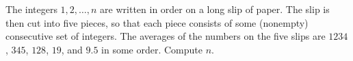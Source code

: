 The integers $1, 2, \dots, n$ are written in order on a long slip of paper. The slip is then cut into five pieces, so that each piece consists of some (nonempty) consecutive set of integers.  The averages of the numbers on the five slips are $1234$, $345$, $128$, $19$, and $9.5$ in some order.  Compute $n$.
